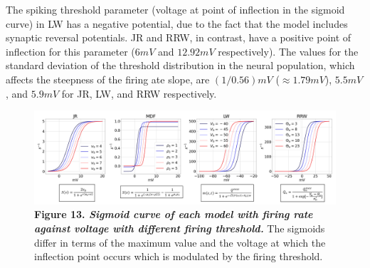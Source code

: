 \documentclass[12pt,twoside]{article}
\begin{document}
The spiking threshold parameter (voltage at point of inflection in the sigmoid curve) in LW has a negative potential, due to the fact that the model includes synaptic reversal potentials. JR and RRW, in contrast, have a positive point of inflection for this parameter ($6mV$ and $12.92mV$ respectively). The values for the standard deviation of the threshold distribution in the neural population, which affects the steepness of the firing ate slope, are $(1/0.56)mV$ ($\approx 1.79mV$), $5.5mV$, and $5.9mV$ for JR, LW, and RRW respectively.  
\begin{figure}[H]
    \hspace{-0.5cm}
    \includegraphics[scale=0.3]{Images/Sigmoid_3_1.png}
    \caption*{\textbf{Figure 13.  \textit{Sigmoid curve of each model with firing rate against voltage with different firing threshold.}} The sigmoids differ in terms of the maximum value and the voltage at which the inflection point occurs which is modulated by the firing threshold.}     
    \label{fig:JR_Sigmoid}
\end{figure}
\end{document}
